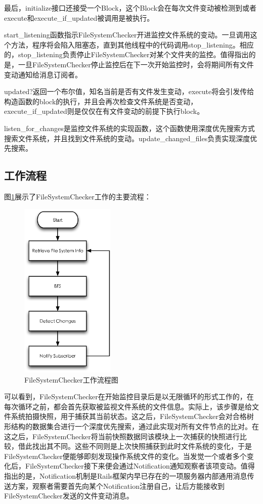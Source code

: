 最后，initialize接口还接受一个Block，这个Block会在每次文件变动被检测到或者execute和execute\_if\_updated被调用是被执行。

start\_listening函数指示FileSystemChecker开进监控文件系统的变动。一旦调用这个方法，程序将会陷入阻塞态，直到其他线程中的代码调用stop\_listening。相应的，stop\_listening负责停止FileSystemChecker对某个文件夹的监控。值得指出的是，一旦FileSystemChecker停止监控后在下一次开始监控时，会将期间所有文件变动通知给消息订阅者。

updated?返回一个布尔值，知名当前是否有文件发生变动，execute将会引发传给构造函数的block的执行，并且会再次检查文件系统是否变动，execute\_if\_updated则是仅仅在有文件变动的前提下执行block。

listen\_for\_changes是监控文件系统的实现函数，这个函数使用深度优先搜索方式搜索文件系统，并且找到文件系统的变动。update\_changed\_files负责实现深度优先搜索。

\subsection{工作流程}
图\ref{fig-fuc-process}展示了FileSystemChecker工作的主要流程：

\begin{figure}[h]
\centering
\includegraphics[width=0.4\textwidth]{images/detail/fuc_process.eps}
\caption{FileSystemChecker工作流程图}
\label{fig-fuc-process}
\end{figure}

可以看到，FileSystemChecker在开始监控目录后是以无限循环的形式工作的，在每次循环之前，都会首先获取被监视文件系统的文件信息。实际上，该步骤是给文件系统拍摄快照，用于捕获其当前状态。这之后，FileSystemChecker会对合格树形结构的数据集合进行一个深度优先搜索，通过此实现对所有文件节点的比对。在这之后，FileSystemChecker将当前快照数据同该模块上一次捕获的快照进行比较，借此找出其不同。这些不同则是上次快照捕获到此时文件系统的变化，于是FileSystemChecker便能够即刻发现操作系统文件的变化。当发觉一个或者多个变化后，FileSystemChecker接下来便会通过Notification通知观察者该项变动。值得指出的是，Notification机制是Rails框架内早已存在的一项服务器内部通用消息传送方案，观察者需要首先向某个Notification注册自己，让后方能接收到FileSystemChecker发送的文件变动消息。

